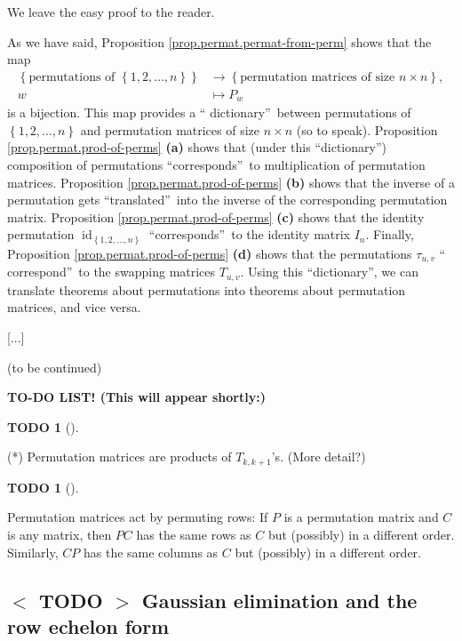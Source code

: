 \documentclass[numbers=enddot,12pt,final,onecolumn,notitlepage]{scrartcl}%
\theoremstyle{definition}
\newtheorem{quest}[theo]{TODO}
\newenvironment{todo}[1][]
{\begin{quest}[#1]\begin{leftbar}}
{\end{leftbar}\end{quest}}
\begin{document}
We leave the easy proof to the reader.

As we have said, Proposition \ref{prop.permat.permat-from-perm} shows that the
map%
\begin{align*}
\left\{  \text{permutations of }\left\{  1,2,\ldots,n\right\}  \right\}   &
\rightarrow\left\{  \text{permutation matrices of size }n\times n\right\}  ,\\
w  &  \mapsto P_{w}%
\end{align*}
is a bijection. This map provides a \textquotedblleft
dictionary\textquotedblright\ between permutations of $\left\{  1,2,\ldots
,n\right\}  $ and permutation matrices of size $n\times n$ (so to speak).
Proposition \ref{prop.permat.prod-of-perms} \textbf{(a)} shows that (under
this \textquotedblleft dictionary\textquotedblright) composition of
permutations \textquotedblleft corresponds\textquotedblright\ to
multiplication of permutation matrices. Proposition
\ref{prop.permat.prod-of-perms} \textbf{(b)} shows that the inverse of a
permutation gets \textquotedblleft translated\textquotedblright\ into the
inverse of the corresponding permutation matrix. Proposition
\ref{prop.permat.prod-of-perms} \textbf{(c)} shows that the identity
permutation $\operatorname*{id}\nolimits_{\left\{  1,2,\ldots,n\right\}  }$
\textquotedblleft corresponds\textquotedblright\ to the identity matrix
$I_{n}$. Finally, Proposition \ref{prop.permat.prod-of-perms} \textbf{(d)}
shows that the permutations $\tau_{u,v}$ \textquotedblleft
correspond\textquotedblright\ to the swapping matrices $T_{u,v}$. Using this
\textquotedblleft dictionary\textquotedblright, we can translate theorems
about permutations into theorems about permutation matrices, and vice versa.

[...]

(to be continued)

\textbf{TO-DO LIST! (This will appear shortly:)}

\begin{todo}
(*) Permutation matrices are products of $T_{k,k+1}$'s. (More detail?)
\end{todo}

\begin{todo}
Permutation matrices act by permuting rows: If $P$ is a permutation matrix and
$C$ is any matrix, then $PC$ has the same rows as $C$ but (possibly) in a
different order. Similarly, $CP$ has the same columns as $C$ but (possibly) in
a different order.
\end{todo}

\subsection{%
$<$%
TODO%
$>$
Gaussian elimination and the row echelon form}
\end{document}
